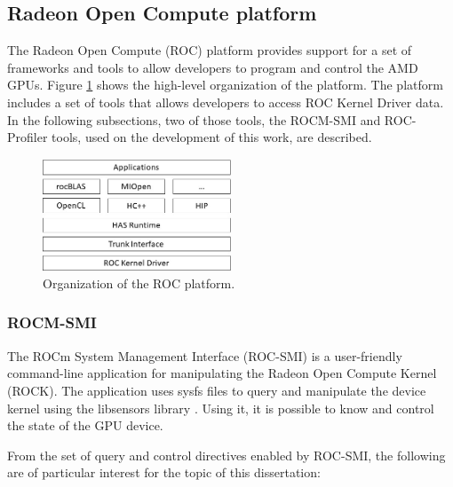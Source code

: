 \subsection{Radeon Open Compute platform}

The Radeon Open Compute (ROC) \cite{noauthor_radeonopencompute/rocm_2019} platform provides support for a set of frameworks and tools to allow developers to program and control the AMD GPUs. Figure \ref{fig:rocmplatform} shows the high-level organization of the platform. The platform includes a set of tools that allows developers to access ROC Kernel Driver data. In the following subsections, two of those tools, the ROCM-SMI \cite{noauthor_radeonopencompute/roc-smi_2019} and ROC-Profiler \cite{noauthor_rocm-developer-tools/rocprofiler_2019} tools, used on the development of this work, are described.

\begin{figure}[!htb]
  \centering
  \includegraphics[width=0.5\textwidth]{Figures/StateArt/ROC_stack.jpg}
  \caption{Organization of the ROC platform.}
  \label{fig:rocmplatform}
\end{figure}

\subsubsection{ROCM-SMI}
The ROCm System Management Interface (ROC-SMI) \cite{noauthor_radeonopencompute/roc-smi_2019} is a user-friendly command-line application for manipulating the Radeon Open Compute Kernel (ROCK). The application uses sysfs files to query and manipulate the device kernel using the libsensors library \cite{noauthor_libsensors3:_nodate}. Using it, it is possible to know and control the state of the GPU device.

From the set of query and control directives enabled by ROC-SMI, the following are of particular interest for the topic of this dissertation:

